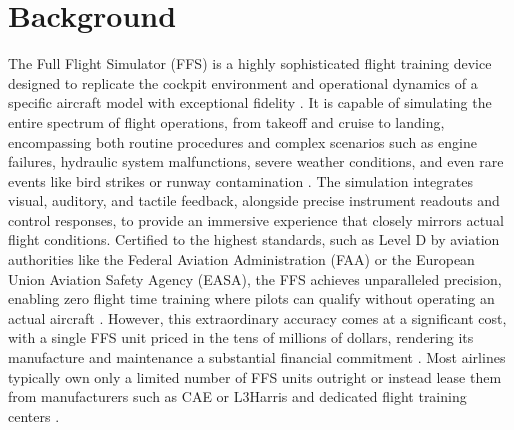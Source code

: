 \documentclass[opre,sglanonrev]{informs4}
\begin{document}
\section{Background}
The Full Flight Simulator (FFS) is a highly sophisticated flight training device designed to replicate the cockpit environment and operational dynamics of a specific aircraft model with exceptional fidelity \citep{ICAO2015}. 
It is capable of simulating the entire spectrum of flight operations, from takeoff and cruise to landing, encompassing both routine procedures and complex scenarios such as engine failures, hydraulic system malfunctions, severe weather conditions, and even rare events like bird strikes or runway contamination \citep{Advancements2024}. The simulation integrates visual, auditory, and tactile feedback, alongside precise instrument readouts and control responses, to provide an immersive experience that closely mirrors actual flight conditions. Certified to the highest standards, such as Level D by aviation authorities like the Federal Aviation Administration (FAA) or the European Union Aviation Safety Agency (EASA), the FFS achieves unparalleled precision, enabling zero flight time training where pilots can qualify without operating an actual aircraft \citep{FAA1995,EASA2020}. However, this extraordinary accuracy comes at a significant cost, with a single FFS unit priced in the tens of millions of dollars, rendering its manufacture and maintenance a substantial financial commitment \citep{CAE7000XR}. Most airlines typically own only a limited number of FFS units outright or instead lease them from manufacturers such as CAE or L3Harris and dedicated flight training centers \citep{IBAAero2023}.
\end{document}
